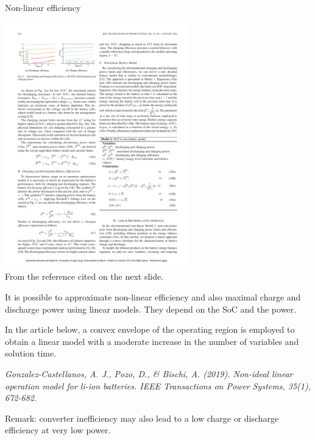 \begin{frame}[allowframebreaks]{Non-linear efficiency}

    \begin{center}
        \includegraphics[width=0.6\textwidth]{images/Non-Ideal_Linear_Operation_Model_for_Li-Ion_Batteries.pdf} \\
        From the reference cited on the next slide.
    \end{center}
    
    It is possible to approximate non-linear efficiency and also maximal charge and discharge power using linear models.
    They depend on the SoC and the power. 
    
    In the article below, a convex envelope of the operating region is employed to obtain a linear model with a moderate increase in the number of variables and solution time.

    \textit{Gonzalez-Castellanos, A. J., Pozo, D., \& Bischi, A. (2019). Non-ideal linear operation model for li-ion batteries. IEEE Transactions on Power Systems, 35(1), 672-682.}

    Remark: converter inefficiency may also lead to a low charge or discharge efficiency at very low power.
\end{frame}


